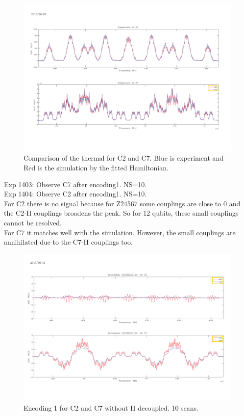 \begin{figure}[htb]
\begin{center}
\includegraphics[width=\columnwidth]{Thermal_C2andC7.pdf}
\end{center}
\setlength{\abovecaptionskip}{-0.35cm}
\caption{\footnotesize{Comparison of the thermal for C2 and C7. Blue is experiment and Red is the simulation by the fitted Hamiltonian.}}\label{1401and1402}
\end{figure}

\clearpage
Exp 1403: Observe C7 after encoding1. NS=10.\\
Exp 1404: Observe C2 after encoding1. NS=10.\\

For C2 there is no signal because for Z24567 some couplings are close to 0 and the C2-H couplings broadens the peak. So for 12 qubits, these small couplings cannot be resolved.\\
For C7 it matches well with the simulation. However, the small couplings are annihilated due to the C7-H couplings too.

\begin{figure}[htb]
\begin{center}
\includegraphics[width=\columnwidth]{Encoding1_without_decouple.pdf}
\end{center}
\setlength{\abovecaptionskip}{-0.35cm}
\caption{\footnotesize{Encoding 1 for C2 and C7 without H decoupled. 10 scans.}}\label{1403and1404}
\end{figure}


